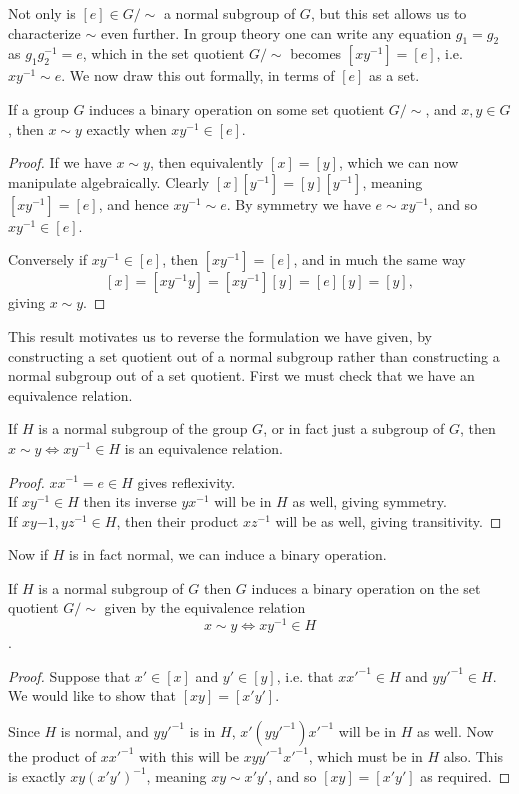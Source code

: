 Not only is $[e] \in G/\sim$ a normal subgroup of $G$, but this set allows us to characterize $\sim$ even further. In group theory one can write any equation $g_1=g_2$ as $g_1g_2^{-1} = e$, which in the set quotient $G/\sim$ becomes $[xy^{-1}] = [e]$, i.e. $xy^{-1} \sim e$. We now draw this out formally, in terms of $[e]$ as a set.
\begin{prop}
	If a group $G$ induces a binary operation on some set quotient $G/\sim$, and $x, y \in G$, then $x \sim y$ exactly when $xy^{-1} \in [e]$.
\end{prop}
\begin{proof}
	If we have $x \sim y$, then equivalently $[x] = [y]$, which we can now manipulate algebraically. Clearly $[x][y^{-1}] = [y][y^{-1}]$, meaning $[xy^{-1}] = [e]$, and hence $xy^{-1} \sim e$. By symmetry we have $e \sim xy^{-1}$, and so $xy^{-1} \in [e]$.
	
	Conversely if $xy^{-1} \in [e]$, then $[xy^{-1}] = [e]$, and in much the same way
	\[[x] = [xy^{-1}y] = [xy^{-1}][y] = [e][y] = [y],\]
	giving $x \sim y$.
\end{proof}

This result motivates us to reverse the formulation we have given, by constructing a set quotient out of a normal subgroup rather than constructing a normal subgroup out of a set quotient. First we must check that we have an equivalence relation.
\begin{prop}\label{normal-equiv}
	If $H$ is a normal subgroup of the group $G$, or in fact just a subgroup of $G$, then $x \sim y \iff xy^{-1} \in H$ is an equivalence relation.
\end{prop}
\begin{proof}
	$xx^{-1} = e \in H$ gives reflexivity.\\
	If $xy^{-1} \in H$ then its inverse $yx^{-1}$ will be in $H$ as well, giving symmetry.\\
	If $xy{-1}, yz^{-1} \in H$, then their product $xz^{-1}$ will be as well, giving transitivity.
\end{proof}

Now if $H$ is in fact normal, we can induce a binary operation.
\begin{prop}
	If $H$ is a normal subgroup of $G$ then $G$ induces a binary operation on the set quotient $G/\sim$ given by the equivalence relation
	\[x \sim y \iff xy^{-1} \in H\].
\end{prop}
\begin{proof}
	Suppose that $x' \in [x]$ and $y' \in [y]$, i.e. that $xx'^{-1} \in H$ and $yy'^{-1} \in H$. We would like to show that $[xy] = [x'y']$.
	
	Since $H$ is normal, and $yy'^{-1}$ is in $H$, $x'\left(yy'^{-1}\right)x'^{-1}$ will be in $H$ as well. Now the product of $xx'^{-1}$ with this will be $xyy'^{-1}x'^{-1}$, which must be in $H$ also. This is exactly $xy\left(x'y'\right)^{-1}$, meaning $xy \sim x'y'$, and so $[xy] = [x'y']$ as required.
\end{proof}


